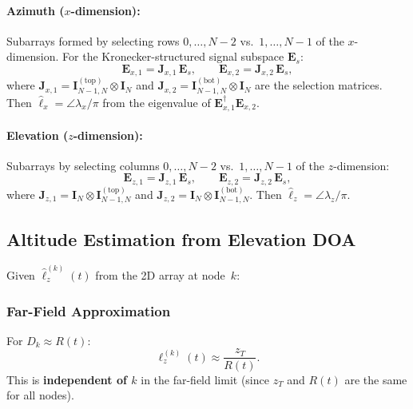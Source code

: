 \documentclass[11pt,a4paper]{article}
\begin{document}
\paragraph{Azimuth ($x$-dimension):}
Subarrays formed by selecting rows $0,\ldots,N{-}2$ vs.\
$1,\ldots,N{-}1$ of the $x$-dimension.  For the Kronecker-structured
signal subspace $\mathbf{E}_s$:
\begin{equation}
  \mathbf{E}_{x,1} = \mathbf{J}_{x,1}\,\mathbf{E}_s, \qquad
  \mathbf{E}_{x,2} = \mathbf{J}_{x,2}\,\mathbf{E}_s,
  \label{eq:esprit_x}
\end{equation}
where $\mathbf{J}_{x,1}=\mathbf{I}_{N-1,N}^{(\mathrm{top})}
\otimes\mathbf{I}_N$ and
$\mathbf{J}_{x,2}=\mathbf{I}_{N-1,N}^{(\mathrm{bot})}
\otimes\mathbf{I}_N$ are the selection matrices.  Then
$\hat{\ell}_x=\angle\lambda_x/\pi$ from the eigenvalue of
$\mathbf{E}_{x,1}^\dagger\mathbf{E}_{x,2}$.

\paragraph{Elevation ($z$-dimension):}
Subarrays by selecting columns $0,\ldots,N{-}2$ vs.\
$1,\ldots,N{-}1$ of the $z$-dimension:
\begin{equation}
  \mathbf{E}_{z,1} = \mathbf{J}_{z,1}\,\mathbf{E}_s, \qquad
  \mathbf{E}_{z,2} = \mathbf{J}_{z,2}\,\mathbf{E}_s,
  \label{eq:esprit_z}
\end{equation}
where $\mathbf{J}_{z,1}=\mathbf{I}_N\otimes
\mathbf{I}_{N-1,N}^{(\mathrm{top})}$ and
$\mathbf{J}_{z,2}=\mathbf{I}_N\otimes
\mathbf{I}_{N-1,N}^{(\mathrm{bot})}$.  Then
$\hat{\ell}_z=\angle\lambda_z/\pi$.

\subsection{Altitude Estimation from Elevation DOA}
\label{sec:zT_from_doa}

Given $\hat{\ell}_z^{(k)}(t)$ from the 2D array at node~$k$:

\subsubsection{Far-Field Approximation}

For $D_k\approx R(t)$:
\begin{equation}
  \ell_z^{(k)}(t) \approx \frac{z_T}{R(t)}.
  \label{eq:lz_farfield}
\end{equation}
This is \textbf{independent of $k$} in the far-field limit (since
$z_T$ and $R(t)$ are the same for all nodes).
\end{document}
